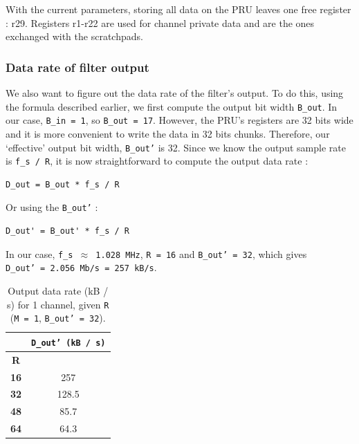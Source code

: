 \documentclass[]{report}
\begin{document}
With the current parameters, storing all data on the PRU leaves one free
register : r29. Registers r1-r22 are used for channel private data and
are the ones exchanged with the scratchpads.

\subsubsection{Data rate of filter output}

We also want to figure out the data rate of the filter's output. To do
this, using the formula described earlier, we first compute the output
bit width \texttt{B\_out}. In our case, \texttt{B\_in\ =\ 1}, so
\texttt{B\_out\ =\ 17}. However, the PRU's registers are 32 bits wide
and it is more convenient to write the data in 32 bits chunks.
Therefore, our `effective' output bit width,
\texttt{B\_out'} is 32. Since we know the output sample
rate is \texttt{f\_s\ /\ R}, it is now straightforward to compute the
output data rate :

\begin{verbatim}
D_out = B_out * f_s / R
\end{verbatim}

\noindent Or using the \texttt{B\_out'} :

\begin{verbatim}
D_out' = B_out' * f_s / R
\end{verbatim}

\noindent In our case, \texttt{f\_s\ $ \approx $ 1.028\ MHz},
\texttt{R\ =\ 16} and \texttt{B\_out'\ =\ 32}, which
gives \texttt{D\_out'\ =\ 2.056\ Mb/s\ =\ 257~kB/s}.

\begin {table}[H]
\begin{center}
\begin{tabular}{|c|c|}
	\hline  & \textbf{\texttt{D\_out'\ (kB\ /\ s)}} \\ 
	\hline \textbf{R} &  \\ 
	\hline \textbf{16} & 257 \\ 
	\hline \textbf{32} & 128.5 \\ 
	\hline \textbf{48} & 85.7 \\ 
	\hline \textbf{64} & 64.3 \\ 
	\hline 
\end{tabular} 
\caption{Output data rate (kB / s) for 1 channel,
	given \texttt{R} (\texttt{M\ =\ 1},
	\texttt{B\_out'\ =\ 32}).}
\end{center}
\end{table}
\end{document}
